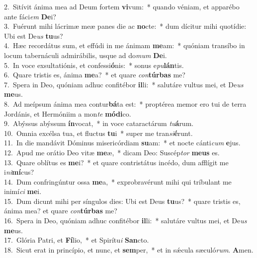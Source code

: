 {2.~}Sitívit ánima mea ad Deum fortem \textbf{vi}vum:~* quando véniam, et apparébo ante fáci\textit{em} \textbf{De}i?\\
{3.~}Fuérunt mihi lácrimæ meæ panes die ac \textbf{no}cte:~* dum dícitur mihi quotídie: Ubi est De\textit{us} \textbf{tu}us?\\
{4.~}Hæc recordátus sum, et effúdi in me ánimam \textbf{me}am:~* quóniam transíbo in locum tabernáculi admirábilis, usque ad do\textit{mum} \textbf{De}i.\\
{5.~}In voce exsultatiónis, et confessi\textbf{ó}nis:~* sonus e\textit{pu}\textbf{lán}tis.\\
{6.~}Quare tristis es, ánima \textbf{me}a?~* et quare \textit{con}\textbf{túr}\textbf{bas} me?\\
{7.~}Spera in Deo, quóniam adhuc confitébor \textbf{il}li:~* salutáre vultus mei, et De\textit{us} \textbf{me}us.\\
{8.~}Ad meípsum ánima mea contur\textbf{bá}ta est:~* proptérea memor ero tui de terra Jordánis, et Hermóniim a mon\textit{te} \textbf{mó}\textbf{di}co.\\
{9.~}Abýssus abýssum \textbf{ín}vocat,~* in voce cataractárum \textit{tu}\textbf{á}rum.\\
{10.~}Omnia excélsa tua, et fluctus \textbf{tu}i~* super me tran\textit{si}\textbf{é}runt.\\
{11.~}In die mandávit Dóminus misericórdiam \textbf{su}am:~* et nocte cánti\textit{cum} \textbf{e}jus.\\
{12.~}Apud me orátio Deo vitæ \textbf{me}æ,~* dicam Deo: Suscép\textit{tor} \textbf{me}\textbf{us} es.\\
{13.~}Quare oblítus es \textbf{me}i?~* et quare contristátus incédo, dum afflígit me i\textit{ni}\textbf{mí}cus?\\
{14.~}Dum confringúntur ossa \textbf{me}a,~* exprobravérunt mihi qui tríbulant me inimí\textit{ci} \textbf{me}i.\\
{15.~}Dum dicunt mihi per síngulos dies: Ubi est Deus \textbf{tu}us?~* quare tristis es, ánima mea? et quare \textit{con}\textbf{túr}\textbf{bas} me?\\
{16.~}Spera in Deo, quóniam adhuc confitébor \textbf{il}li:~* salutáre vultus mei, et De\textit{us} \textbf{me}us.\\
{17.~}Glória Patri, et \textbf{Fí}lio,~* et Spirítu\textit{i} \textbf{San}cto.\\
{18.~}Sicut erat in princípio, et nunc, et \textbf{sem}per,~* et in sǽcula sæculó\textit{rum}. \textbf{A}men.\\

